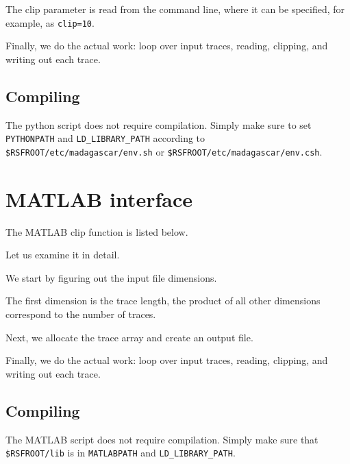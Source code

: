 
The clip parameter is read from the command line, where it can be specified,
for example, as \texttt{clip=10}.


Finally, we do the actual work: loop over input traces, reading,
clipping, and writing out each trace.

\subsection{Compiling}

The python script does not require compilation. Simply make sure to set
\texttt{PYTHONPATH} and \texttt{LD\_LIBRARY\_PATH} according to \\
\texttt{\$RSFROOT/etc/madagascar/env.sh} or \texttt{\$RSFROOT/etc/madagascar/env.csh}.

\section{MATLAB interface} 

\lstset{language=matlab}
\renewcommand{\rsfclip}{\RSF/api/matlab/test/clip.m}

The MATLAB clip function is listed below.



Let us examine it in detail. 


We start by figuring out the input file dimensions.


The first dimension is the trace length, the product of all other
dimensions correspond to the number of traces.


Next, we allocate the trace array and create an output file.


Finally, we do the actual work: loop over input traces, reading,
clipping, and writing out each trace.

\subsection{Compiling}

The MATLAB script does not require compilation. Simply make sure that
\texttt{\$RSFROOT/lib} is in \texttt{MATLABPATH} and \texttt{LD\_LIBRARY\_PATH}.

